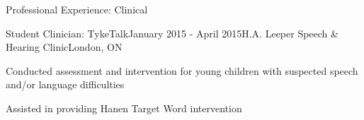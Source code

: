 \documentclass{resume} %
\begin{document}
\begin{rSection}{Professional Experience: Clinical}
	
	\begin{rSubsection}{Student Clinician: TykeTalk}{January 2015 - April 2015}{H.A. Leeper Speech \& Hearing Clinic}{London, ON}
	\item Conducted assessment and intervention for young children with suspected speech and/or language difficulties
	\item Assisted in providing Hanen Target Word intervention
	\end{rSubsection}
\end{rSection}

%
%
%
%
%
%
\end{document}
